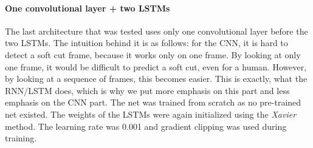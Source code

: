 \paragraph{One convolutional layer + two LSTMs}
The last architecture that was tested uses only one convolutional layer before the two LSTMs.
The intuition behind it is as follows: for the CNN, it is hard to detect a soft cut frame, because it works only on one frame.
By looking at only one frame, it would be difficult to predict a soft cut, even for a human.
However, by looking at a sequence of frames, this becomes easier.
This is exactly, what the RNN/LSTM does, which is why we put more emphasis on this part and less emphasis on the CNN part.
The net was trained from scratch as no pre-trained net existed.
The weights of the LSTMs were again initialized using the \textit{Xavier} method.
The learning rate was 0.001 and gradient clipping was used during training.

